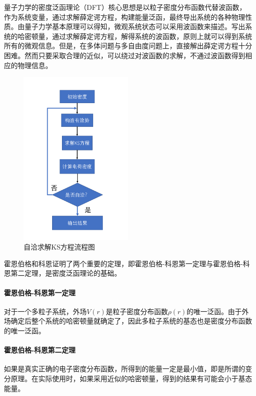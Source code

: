 量子力学的密度泛函理论（DFT）核心思想是以粒子密度分布函数代替波函数，作为系统变量，通过求解薛定谔方程，构建能量泛函，最终导出系统的各种物理性质。由量子力学基本原理可以得知，微观系统状态可以采用波函数来描述。写出系统的哈密顿量，通过求解薛定谔方程，解得系统的波函数，原则上就可以得到系统所有的微观信息。但是，在多体问题与多自由度问题上，直接解出薛定谔方程十分困难。然而只要采取合理的近似，可以绕过对波函数的求解，不通过波函数得到相应的物理信息。
\begin{figure}[h]
    \centering
\includegraphics[width=0.5\textwidth]{./pic/012.png}
\caption{自洽求解KS方程流程图}

\label{dog012}
\end{figure}

霍恩伯格和科恩证明了两个重要的定理，即霍恩伯格-科恩第一定理与霍恩伯格-科恩第二定理，是密度泛函理论的基础。

\paragraph{霍恩伯格-科恩第一定理}
对于一个多粒子系统，外场$V(r)$是粒子密度分布函数$\rho(r)$的唯一泛函。由于外场确定后整个系统的哈密顿量就确定了，因此多粒子系统的基态也是密度分布函数的唯一泛函。

\paragraph{霍恩伯格-科恩第二定理}
如果是真实正确的电子密度分布函数，所得到的能量一定是最小值，即是所谓的变分原理。在实际使用时，如果采用近似的哈密顿量，得到的结果有可能会小于基态能量。

